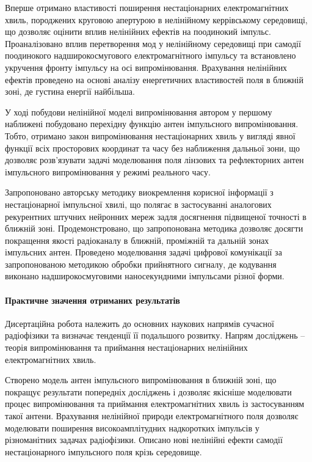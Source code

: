 Вперше отримано властивості поширення нестаціонарних електромагнітних 
хвиль, породжених круговою апертурою в нелінійному керрівському 
середовищі, що дозволяє оцінити вплив нелінійних ефектів на поодинокий 
імпульс. Проаналізовано вплив перетворення мод у нелінійному середовищі 
при самодії поодинокого надширокосмугового електромагнітного імпульсу та 
встановлено укручення фронту імпульсу на осі випромінювання. 
Врахування нелінійних ефектів проведено на основі аналізу енергетичних 
властивостей поля в ближній зоні, де густина енергії найбільша.

У ході побудови нелінійної моделі випромінювання автором у першому 
наближені побудовано перехідну функцію антен імпульсного випромінювання. 
Тобто, отримано закон випромінювання нестаціонарних хвиль у вигляді 
явної функції всіх просторових координат та часу без наближення 
дальньої зони, що дозволяє розв’язувати задачі моделювання поля
лінзових та рефлекторних антен імпульсного випромінювання  у 
режимі реального часу.

Запропоновано авторську методику виокремлення корисної інформації з 
нестаціонарної імпульсної хвилі, що полягає в застосуванні аналогових 
рекурентних штучних нейронних мереж задля досягнення підвищеної точності 
в ближній зоні. Продемонстровано, що запропонована методика дозволяє 
досягти покращення якості радіоканалу в ближній, проміжній та дальній 
зонах імпульсних антен. Проведено моделювання задачі цифрової 
комунікації за запропонованою методикою обробки прийнятного 
сигналу, де кодування виконано надширокосмуговими наносекундними 
імпульсами різної форми.

\paragraph{Практичне значення отриманих результатів}

Дисертаційна робота належить до основних наукових напрямів сучасної 
радіофізики та визначає тенденції її подальшого розвитку. Напрям
досліджень -- теорія випромінювання та приймання нестаціонарних 
нелінійних електромагнітних хвиль.

Створено модель антен імпульсного випромінювання в ближній зоні, що 
покращує результати попередніх досліджень і дозволяє якісніше моделювати 
процес випромінювання та приймання електромагнітних хвиль із застосуванням 
такої антени. Врахування нелінійної природи електромагнітного поля дозволяє
моделювати поширення високоамплітудних надкоротких імпульсів у різноманітних
задачах радіофізики. Описано нові нелінійні ефекти самодії нестаціонарного 
імпульсного поля крізь середовище.

